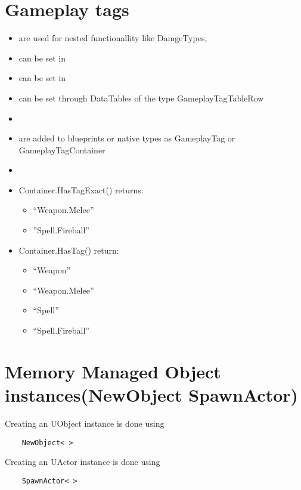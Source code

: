\bigskip

    \section{Gameplay tags}
        \begin{itemize}
            \item are used for nested functionallity like DamgeTypes, 
            \item can be set in 
            \item can be set in 
            \item can be set through DataTables of the type GameplayTagTableRow
            \item 
            \item are added to blueprints or native types as GameplayTag or GameplayTagContainer
            \item 
            \item Container.HasTagExact() returns:
            \begin{itemize}
                \item “Weapon.Melee”
                \item ”Spell.Fireball” 
            \end{itemize}
            \item Container.HasTag() return:
            \begin{itemize}
                \item “Weapon”
                \item “Weapon.Melee” 
                \item “Spell” 
                \item “Spell.Fireball”
            \end{itemize} 
        \end{itemize}

    \section{Memory Managed Object instances(NewObject SpawnActor)}
        Creating an UObject instance is done using
        \begin{lstlisting}
    NewObject< >
        \end{lstlisting}
        Creating an UActor instance is done using
        \begin{lstlisting}
    SpawnActor< >
        \end{lstlisting}

